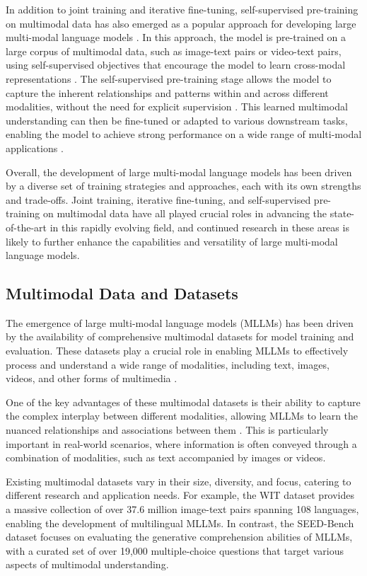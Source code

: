 \documentclass[11pt]{article}
\begin{document}
In addition to joint training and iterative fine-tuning, self-supervised pre-training on multimodal data has also emerged as a popular approach for developing large multi-modal language models \cite{ref41}. In this approach, the model is pre-trained on a large corpus of multimodal data, such as image-text pairs or video-text pairs, using self-supervised objectives that encourage the model to learn cross-modal representations \cite{ref42}. The self-supervised pre-training stage allows the model to capture the inherent relationships and patterns within and across different modalities, without the need for explicit supervision \cite{ref43}. This learned multimodal understanding can then be fine-tuned or adapted to various downstream tasks, enabling the model to achieve strong performance on a wide range of multi-modal applications \cite{ref44}.

Overall, the development of large multi-modal language models has been driven by a diverse set of training strategies and approaches, each with its own strengths and trade-offs. Joint training, iterative fine-tuning, and self-supervised pre-training on multimodal data have all played crucial roles in advancing the state-of-the-art in this rapidly evolving field, and continued research in these areas is likely to further enhance the capabilities and versatility of large multi-modal language models.

\subsection{Multimodal Data and Datasets}

The emergence of large multi-modal language models (MLLMs) has been driven by the availability of comprehensive multimodal datasets for model training and evaluation. These datasets play a crucial role in enabling MLLMs to effectively process and understand a wide range of modalities, including text, images, videos, and other forms of multimedia \cite{ref31,ref45}.

One of the key advantages of these multimodal datasets is their ability to capture the complex interplay between different modalities, allowing MLLMs to learn the nuanced relationships and associations between them \cite{ref46,ref47}. This is particularly important in real-world scenarios, where information is often conveyed through a combination of modalities, such as text accompanied by images or videos.

Existing multimodal datasets vary in their size, diversity, and focus, catering to different research and application needs. For example, the WIT dataset \cite{ref47} provides a massive collection of over 37.6 million image-text pairs spanning 108 languages, enabling the development of multilingual MLLMs. In contrast, the SEED-Bench dataset \cite{ref46} focuses on evaluating the generative comprehension abilities of MLLMs, with a curated set of over 19,000 multiple-choice questions that target various aspects of multimodal understanding.
\end{document}
